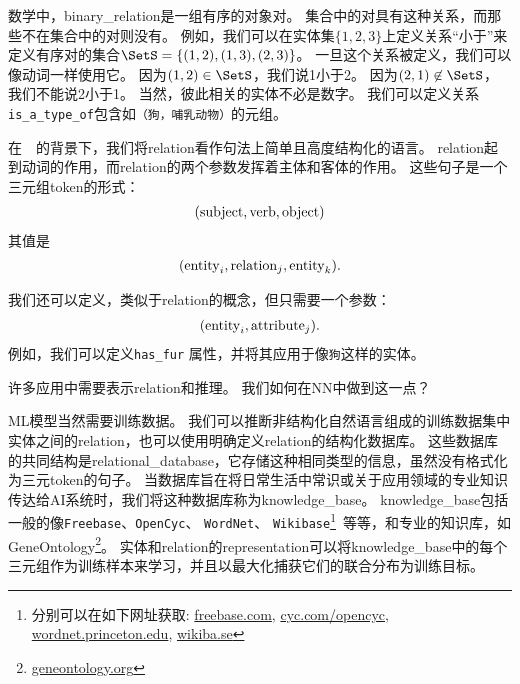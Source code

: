 数学中，\gls{binary_relation}是一组有序的对象对。
集合中的对具有这种关系，而那些不在集合中的对则没有。
例如，我们可以在实体集$\{ 1, 2, 3 \}$上定义关系``小于''来定义有序对的集合$\SetS = \{ (1, 2), (1, 3), (2, 3) \}$。
一旦这个关系被定义，我们可以像动词一样使用它。
因为$(1, 2) \in \SetS$，我们说1小于2。
因为$(2, 1) \not \in \SetS$，我们不能说2小于1。
当然，彼此相关的实体不必是数字。
我们可以定义关系{\tt is\_a\_type\_of}包含如{\tt（狗，哺乳动物）}的元组。

在~~的背景下，我们将\gls{relation}看作句法上简单且高度结构化的语言。
\gls{relation}起到动词的作用，而\gls{relation}的两个参数发挥着主体和客体的作用。
这些句子是一个三元组\gls{token}的形式：
\begin{align}
({\rm subject}, {\rm verb}, {\rm object})
\end{align}
其值是
\begin{align}
  ({\rm entity}_i, {\rm relation}_j, {\rm entity}_k).
\end{align}

我们还可以定义，类似于\gls{relation}的概念，但只需要一个参数：
\begin{align}
  ( {\rm entity}_i, {\rm attribute}_j ).
\end{align}
例如，我们可以定义{\tt has\_fur} 属性，并将其应用于像{\tt 狗}这样的实体。

许多应用中需要表示\gls{relation}和推理。
我们如何在\gls{NN}中做到这一点？

\gls{ML}模型当然需要训练数据。
我们可以推断非结构化自然语言组成的训练数据集中实体之间的\gls{relation}，也可以使用明确定义\gls{relation}的结构化数据库。 
这些数据库的共同结构是\gls{relational_database}，它存储这种相同类型的信息，虽然没有格式化为三元\gls{token}的句子。
当数据库旨在将日常生活中常识或关于应用领域的专业知识传达给\gls{AI}系统时，我们将这种数据库称为\gls{knowledge_base}。
\gls{knowledge_base}包括一般的像{\tt Freebase}、{\tt OpenCyc}、 {\tt WordNet}、 {\tt Wikibase}\footnote{分别可以在如下网址获取: \url{freebase.com}, \url{cyc.com/opencyc},
\url{wordnet.princeton.edu}, \url{wikiba.se}}~等等，和专业的知识库，如GeneOntology\footnote{\url{geneontology.org}}。
实体和\gls{relation}的\gls{representation}可以将\gls{knowledge_base}中的每个三元组作为训练样本来学习，并且以最大化捕获它们的联合分布为训练目标\citep{Bordes-et-al-LSML2013}。

